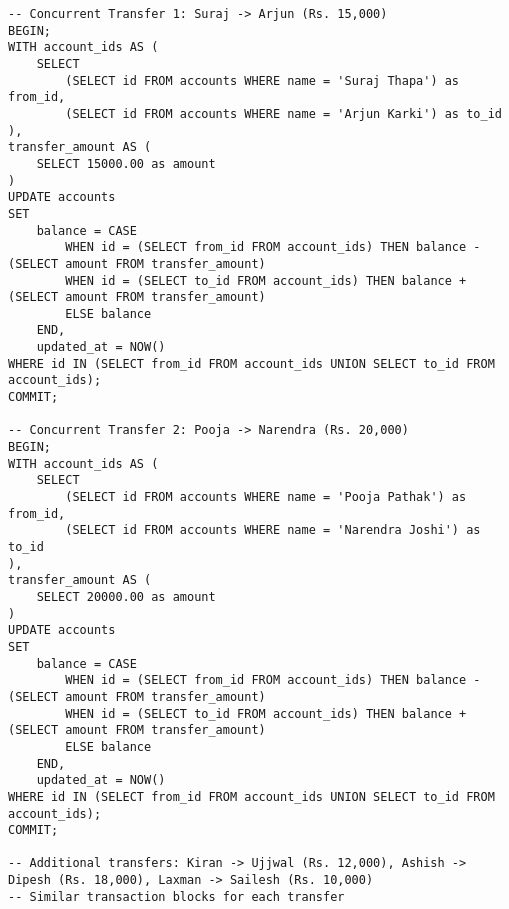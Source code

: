 \begin{verbatim}
-- Concurrent Transfer 1: Suraj -> Arjun (Rs. 15,000)
BEGIN;
WITH account_ids AS (
    SELECT
        (SELECT id FROM accounts WHERE name = 'Suraj Thapa') as from_id,
        (SELECT id FROM accounts WHERE name = 'Arjun Karki') as to_id
),
transfer_amount AS (
    SELECT 15000.00 as amount
)
UPDATE accounts
SET
    balance = CASE
        WHEN id = (SELECT from_id FROM account_ids) THEN balance - (SELECT amount FROM transfer_amount)
        WHEN id = (SELECT to_id FROM account_ids) THEN balance + (SELECT amount FROM transfer_amount)
        ELSE balance
    END,
    updated_at = NOW()
WHERE id IN (SELECT from_id FROM account_ids UNION SELECT to_id FROM account_ids);
COMMIT;

-- Concurrent Transfer 2: Pooja -> Narendra (Rs. 20,000)
BEGIN;
WITH account_ids AS (
    SELECT
        (SELECT id FROM accounts WHERE name = 'Pooja Pathak') as from_id,
        (SELECT id FROM accounts WHERE name = 'Narendra Joshi') as to_id
),
transfer_amount AS (
    SELECT 20000.00 as amount
)
UPDATE accounts
SET
    balance = CASE
        WHEN id = (SELECT from_id FROM account_ids) THEN balance - (SELECT amount FROM transfer_amount)
        WHEN id = (SELECT to_id FROM account_ids) THEN balance + (SELECT amount FROM transfer_amount)
        ELSE balance
    END,
    updated_at = NOW()
WHERE id IN (SELECT from_id FROM account_ids UNION SELECT to_id FROM account_ids);
COMMIT;

-- Additional transfers: Kiran -> Ujjwal (Rs. 12,000), Ashish -> Dipesh (Rs. 18,000), Laxman -> Sailesh (Rs. 10,000)
-- Similar transaction blocks for each transfer
\end{verbatim}

